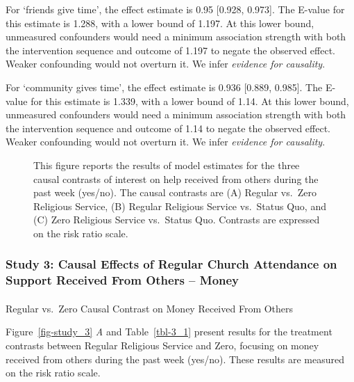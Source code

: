 \documentclass[
  single column]{article}
\makeatletter
\let\oldparagraph\paragraph
\renewcommand{\paragraph}{
    \@ifstar
      \xxxParagraphStar
      \xxxParagraphNoStar
  }
\newcommand{\xxxParagraphStar}[1]{\oldparagraph*{#1}\mbox{}}
\newcommand{\xxxParagraphNoStar}[1]{\oldparagraph{#1}\mbox{}}
\makeatother
\begin{document}
For `friends give time', the effect estimate is 0.95 {[}0.928, 0.973{]}.
The E-value for this estimate is 1.288, with a lower bound of 1.197. At
this lower bound, unmeasured confounders would need a minimum
association strength with both the intervention sequence and outcome of
1.197 to negate the observed effect. Weaker confounding would not
overturn it. We infer \emph{evidence for causality}.

For `community gives time', the effect estimate is 0.936 {[}0.889,
0.985{]}. The E-value for this estimate is 1.339, with a lower bound of
1.14. At this lower bound, unmeasured confounders would need a minimum
association strength with both the intervention sequence and outcome of
1.14 to negate the observed effect. Weaker confounding would not
overturn it. We infer \emph{evidence for causality}.

\begin{figure}


\caption{\label{fig-study2}This figure reports the results of model
estimates for the three causal contrasts of interest on help received
from others during the past week (yes/no). The causal contrasts are (A)
Regular vs.~Zero Religious Service, (B) Regular Religious Service
vs.~Status Quo, and (C) Zero Religious Service vs.~Status Quo. Contrasts
are expressed on the risk ratio scale.}

\end{figure}%

\newpage{}

\subsubsection{Study 3: Causal Effects of Regular Church Attendance on
Support Received From Others --
Money}\label{study-3-causal-effects-of-regular-church-attendance-on-support-received-from-others-money}

\paragraph{Regular vs.~Zero Causal Contrast on Money Received From
Others}\label{regular-vs.-zero-causal-contrast-on-money-received-from-others}

Figure~\ref{fig-study_3} \emph{A} and Table~\ref{tbl-3_1} present
results for the treatment contrasts between Regular Religious Service
and Zero, focusing on money received from others during the past week
(yes/no). These results are measured on the risk ratio scale.
\end{document}
